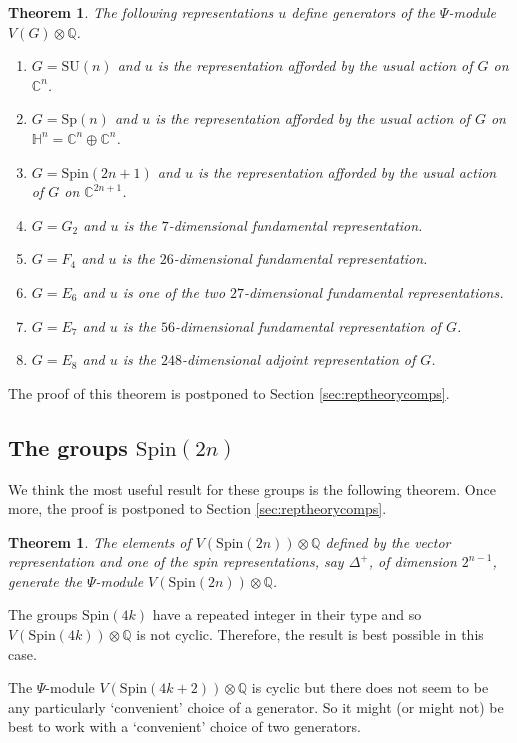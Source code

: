 \documentclass[twoside,a4paper,reqno,11pt]{amsart}
\newtheorem{theorem}[lemma]{Theorem}
\newcommand{\C}{\mathbb{C}}
\renewcommand{\H}{\mathbb{H}}
\newcommand{\Q}{\mathbb{Q}}
\renewcommand{\o}{\otimes}
\newcommand{\SU}{\mathrm{SU}}
\newcommand{\Spin}{\mathrm{Spin}}
\newcommand{\Sp}{\mathrm{Sp}}
\begin{document}
\begin{theorem} \label{thm:minmodgen}
The following representations $u$ define generators of the $\Psi$-module $V(G)\o\Q$. 
\begin{enumerate}
\item $G = \SU(n)$ and $u$ is the representation afforded by the usual action of $G$ on $\C^{n}$. 
\item $G = \Sp(n)$ and $u$ is the representation afforded by the usual action of $G$ on $\H^n = \C^{n} \oplus \C^{n}$. 
\item $G = \Spin(2n+1)$ and $u$ is the representation afforded by the usual action of $G$ on $\C^{2n+1}$.
\item $G=G_2$ and $u$ is the $7$-dimensional fundamental representation. 
\item $G=F_4$ and $u$ is the $26$-dimensional fundamental representation. 
\item $G=E_6$ and $u$ is one of the two $27$-dimensional fundamental representations. 
\item $G=E_7$ and $u$ is the $56$-dimensional fundamental representation of $G$. 
\item $G=E_8$ and $u$ is the $248$-dimensional adjoint representation of $G$. 
\end{enumerate}
\end{theorem}

The proof of this theorem is postponed to Section \ref{sec:reptheorycomps}.

\subsection{The groups $\Spin(2n)$} \label{sec:spin2l}

We think the most useful result for these groups is the following theorem. Once more, the proof is postponed to Section \ref{sec:reptheorycomps}.

\begin{theorem} \label{thm:minmodgenSpineven}
The elements of $V(\Spin(2n))\o\Q$ defined by the vector representation and one of the spin representations, say $\Delta^+$, of dimension $2^{n-1}$, generate the $\Psi$-module $V(\Spin(2n))\o\Q$. 
\end{theorem}

The groups $\Spin(4k)$ have a repeated integer in their type and so $V(\Spin(4k))\o\Q$ is not cyclic. Therefore, the result is best possible in this case. 

The $\Psi$-module $V(\Spin(4k+2))\o\Q$ is cyclic but there does not seem to be any particularly `convenient' choice of a generator. So it might (or might not) be best to work with a `convenient' choice of two generators.
\end{document}
